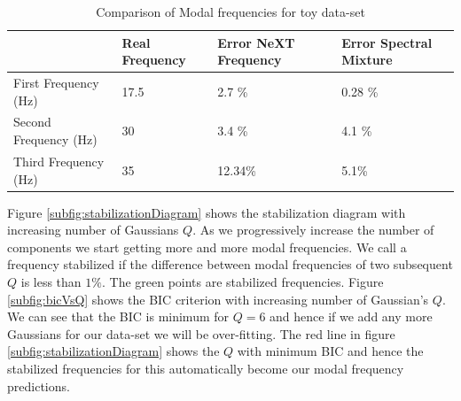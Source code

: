 \renewcommand{\arraystretch}{1}
\begin{table}[!ht]
    \centering
\begin{tabular}{|l|l|l|l|}
  \hline
   & Real Frequency & Error NeXT Frequency & Error Spectral Mixture\\
  \hline 
  \hline
First Frequency (Hz) & 17.5 & 2.7 \% & 0.28 \%\\
Second Frequency (Hz)  & 30 & 3.4 \% & 4.1 \%\\
Third Frequency (Hz) & 35 & 12.34\% & 5.1\%\\
   \hline
\end{tabular}
\caption{Comparison of Modal frequencies for toy data-set}
  \label{tabComparisonOfModalFrequenciesToyData}
\end{table}

Figure \ref{subfig:stabilizationDiagram} shows the stabilization diagram with increasing number of Gaussians $Q$. As we progressively increase the number of components we start getting more and more modal frequencies. We call a frequency stabilized if the difference between modal frequencies of two subsequent $Q$ is less than $1\%$. The green points are stabilized frequencies. Figure \ref{subfig:bicVsQ} shows the BIC criterion with increasing number of Gaussian's $Q$. We can see that the BIC is minimum for $Q=6$ and hence if we add any more Gaussians for our data-set we will be over-fitting. The red line in figure \ref{subfig:stabilizationDiagram} shows the $Q$ with minimum BIC and hence the stabilized frequencies for this automatically become our modal frequency predictions.

